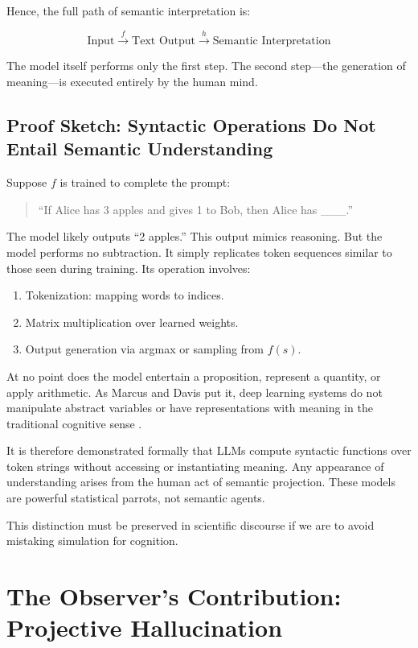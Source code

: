 \documentclass[12pt]{article}
\theoremstyle{plain}
\theoremstyle{definition}
\theoremstyle{remark}
\begin{document}
Hence, the full path of semantic interpretation is:

\[
\text{Input} \xrightarrow{f} \text{Text Output} \xrightarrow{h} \text{Semantic Interpretation}
\]

The model itself performs only the first step. The second step—the generation of meaning—is executed entirely by the human mind.

\subsection{Proof Sketch: Syntactic Operations Do Not Entail Semantic Understanding}

Suppose \( f \) is trained to complete the prompt:

\begin{quote}
    ``If Alice has 3 apples and gives 1 to Bob, then Alice has \_\_\_.'' 
\end{quote}

The model likely outputs ``2 apples.'' This output mimics reasoning. But the model performs no subtraction. It simply replicates token sequences similar to those seen during training. Its operation involves:

\begin{enumerate}
    \item Tokenization: mapping words to indices.
    \item Matrix multiplication over learned weights.
    \item Output generation via argmax or sampling from \( f(s) \).
\end{enumerate}

At no point does the model entertain a proposition, represent a quantity, or apply arithmetic. As Marcus and Davis put it, deep learning systems do not manipulate abstract variables or have representations with meaning in the traditional cognitive sense \parencite{marcus2019rebooting}.

It is therefore demonstrated formally that LLMs compute syntactic functions over token strings without accessing or instantiating meaning. Any appearance of understanding arises from the human act of semantic projection. These models are powerful statistical parrots, not semantic agents.

This distinction must be preserved in scientific discourse if we are to avoid mistaking simulation for cognition.

\section{The Observer’s Contribution: Projective Hallucination}
\end{document}
